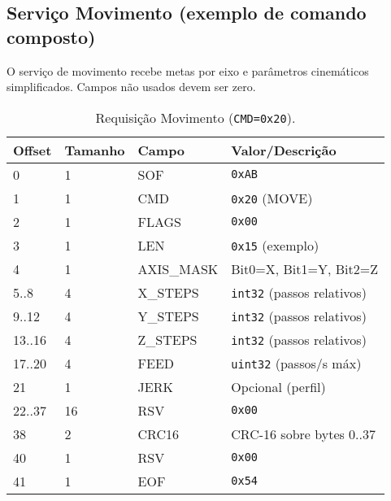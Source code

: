\subsection*{Servi\c{c}o Movimento (exemplo de comando composto)}

O servi\c{c}o de movimento recebe metas por eixo e par\^ametros cinem\'aticos
simplificados. Campos n\~ao usados devem ser zero.

\begin{table}[h]
  \centering
  \caption{Requisi\c{c}\~ao Movimento (\texttt{CMD=0x20}).}
  \label{tab:spi-move-req}
  \setlength{\tabcolsep}{4pt}\footnotesize
  \begin{tabularx}{\textwidth}{lllX}
    \toprule
    Offset & Tamanho & Campo & Valor/Descri\c{c}\~ao \\
    \midrule
    0 & 1 & SOF & \texttt{0xAB} \\
    1 & 1 & CMD & \texttt{0x20} (MOVE) \\
    2 & 1 & FLAGS & \texttt{0x00} \\
    3 & 1 & LEN & \texttt{0x15} (exemplo) \\
    4 & 1 & AXIS\_MASK & Bit0=X, Bit1=Y, Bit2=Z \\
    5..8 & 4 & X\_STEPS & \texttt{int32} (passos relativos) \\
    9..12 & 4 & Y\_STEPS & \texttt{int32} (passos relativos) \\
    13..16 & 4 & Z\_STEPS & \texttt{int32} (passos relativos) \\
    17..20 & 4 & FEED & \texttt{uint32} (passos/s m\'ax) \\
    21 & 1 & JERK & Opcional (perfil) \\
    22..37 & 16 & RSV & \texttt{0x00} \\
    38 & 2 & CRC16 & CRC-16 sobre bytes 0..37 \\
    40 & 1 & RSV & \texttt{0x00} \\
    41 & 1 & EOF & \texttt{0x54} \\
    \bottomrule
  \end{tabularx}
\end{table}

